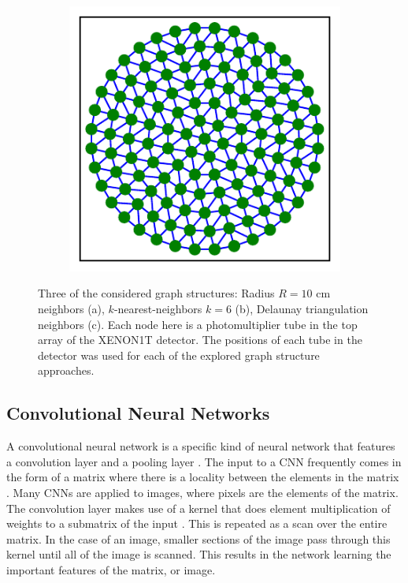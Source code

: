 \documentclass[../thesis.tex]{subfiles}
\begin{document}
\begin{figure}[t]
\begin{subfigure}{0.32\textwidth}
		\caption{}
	\end{subfigure}
	\begin{subfigure}{0.32\textwidth}
		\includegraphics[width=\textwidth]{figures/1T_delaunay-graph.pdf}
		\caption{}
	\end{subfigure}
	\caption{
	Three of the considered graph structures: Radius $R=10$ cm neighbors (a), $k$-nearest-neighbors $k=6$ (b), Delaunay triangulation neighbors (c).
	Each node here is a photomultiplier tube in the top array of the XENON1T detector.
	The positions of each tube in the detector was used for each of the explored graph structure approaches.
	}
	\label{fig:graph_structs}
\end{figure}
\subsection{Convolutional Neural Networks}\label{subsec:CNN}
A convolutional neural network is a specific kind of neural network that features a convolution layer and a pooling layer \cite{deep-learning}.
The input to a CNN frequently comes in the form of a matrix where there is a locality between the elements in the matrix \cite{deep-learning}.
Many CNNs are applied to images, where pixels are the elements of the matrix.
The convolution layer makes use of a kernel that does element multiplication of weights to a submatrix of the input \cite{deep-learning}.
This is repeated as a scan over the entire matrix.
In the case of an image, smaller sections of the image pass through this kernel until all of the image is scanned.
This results in the network learning the important features of the matrix, or image.
\end{document}
